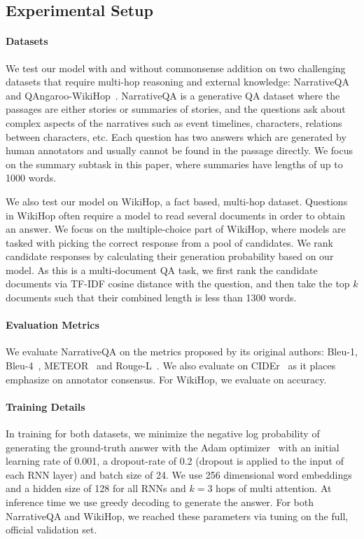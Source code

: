 \documentclass[11pt,a4paper]{article}
\begin{document}
\subsection{Experimental Setup}
\paragraph{Datasets}
We test our model with and without commonsense addition on two challenging datasets that require multi-hop reasoning and external knowledge: NarrativeQA~\cite{kovcisky2017narrativeqa} and QAngaroo-WikiHop~\cite{welbl2017constructing}. 
NarrativeQA is a generative QA dataset where the passages are either stories or summaries of stories, and the questions ask about complex aspects of the narratives such as event timelines, characters, relations between characters, etc.
Each question has two answers which are generated by human annotators and usually cannot be found in the passage directly.
We focus on the summary subtask in this paper, where summaries have lengths of up to 1000 words.


We also test our model on WikiHop, a fact based, multi-hop dataset.
Questions in WikiHop often require a model to read several documents in order to obtain an answer.
We focus on the multiple-choice part of WikiHop, where models are tasked with picking the correct response from a pool of candidates.
We rank candidate responses by calculating their generation probability based on our model.
As this is a multi-document QA task, we first rank the candidate documents via TF-IDF cosine distance with the question, and then take the top $k$ documents such that their combined length is less than 1300 words.

\paragraph{Evaluation Metrics}
We evaluate NarrativeQA on the metrics proposed by its original authors: Bleu-1, Bleu-4~\cite{papineni2002bleu}, METEOR~\cite{banerjee2005meteor} and Rouge-L~\cite{lin2004rouge}.
We also evaluate on CIDEr~\cite{vedantam2015cider} as it places emphasize on annotator consensus.
For WikiHop, we evaluate on accuracy.


\paragraph{Training Details}
In training for both datasets, we minimize the negative log probability of generating the ground-truth answer with the Adam optimizer~\cite{kingma2014adam} with an initial learning rate of 0.001, a dropout-rate of 0.2 (dropout is applied to the input of each RNN layer) and batch size of 24. We use 256 dimensional word embeddings and a hidden size of 128 for all RNNs and $k=3$ hops of multi attention. At inference time we use greedy decoding to generate the answer.
For both NarrativeQA and WikiHop, we reached these parameters via tuning on the full, official validation set.
\end{document}
